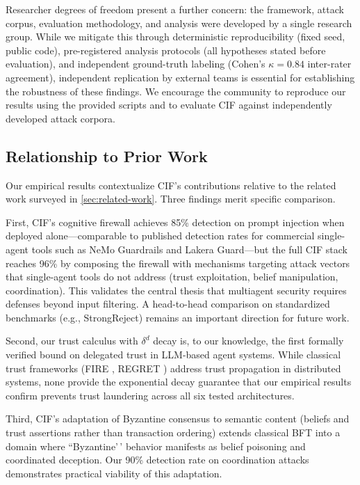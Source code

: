 \documentclass[
]{article}
\newcounter{none} %
\begin{document}
Researcher degrees of freedom present a further concern: the framework,
attack corpus, evaluation methodology, and analysis were developed by a
single research group. While we mitigate this through deterministic
reproducibility (fixed seed, public code), pre-registered analysis
protocols (all hypotheses stated before evaluation), and independent
ground-truth labeling (Cohen's \(\kappa = 0.84\) inter-rater agreement),
independent replication by external teams is essential for establishing
the robustness of these findings. We encourage the community to
reproduce our results using the provided scripts and to evaluate CIF
against independently developed attack corpora.

\subsection{Relationship to Prior
Work}\label{relationship-to-prior-work}

Our empirical results contextualize CIF's contributions relative to the
related work surveyed in \cref{sec:related-work}. Three findings merit
specific comparison.

First, CIF's cognitive firewall achieves 85\% detection on prompt
injection when deployed alone---comparable to published detection rates
for commercial single-agent tools such as NeMo Guardrails
\cite{rebedea2023nemo} and Lakera Guard---but the full CIF stack reaches
96\% by composing the firewall with mechanisms targeting attack vectors
that single-agent tools do not address (trust exploitation, belief
manipulation, coordination). This validates the central thesis that
multiagent security requires defenses beyond input filtering. A
head-to-head comparison on standardized benchmarks (e.g., StrongReject)
remains an important direction for future work.

Second, our trust calculus with \(\delta^d\) decay is, to our knowledge,
the first formally verified bound on delegated trust in LLM-based agent
systems. While classical trust frameworks (FIRE \cite{huynh2006fire},
REGRET \cite{sabater2001regret}) address trust propagation in
distributed systems, none provide the exponential decay guarantee that
our empirical results confirm prevents trust laundering across all six
tested architectures.

Third, CIF's adaptation of Byzantine consensus to semantic content
(beliefs and trust assertions rather than transaction ordering) extends
classical BFT \cite{lamport1982byzantine, castro1999practical} into a
domain where ``Byzantine'\,' behavior manifests as belief poisoning and
coordinated deception. Our 90\% detection rate on coordination attacks
demonstrates practical viability of this adaptation.
\end{document}
